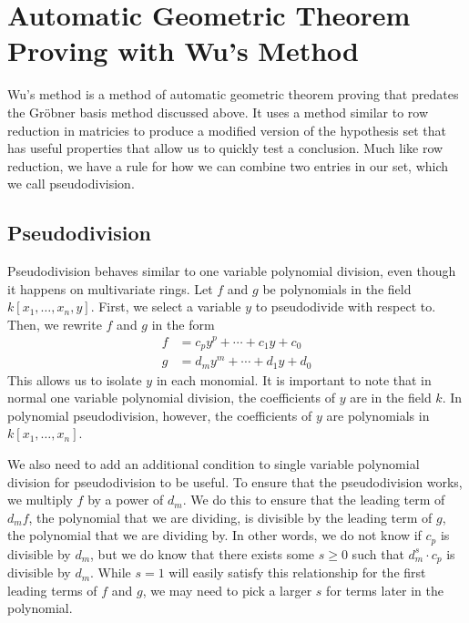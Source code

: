 \documentclass{article}
\theoremstyle{plain}
\theoremstyle{definition}
\theoremstyle{remark}
\newcommand{\gro}{Gr\"obner }
\begin{document}
\section{Automatic Geometric Theorem Proving with Wu's Method}
Wu's method is a method of automatic geometric theorem proving that predates the \gro basis method discussed above. 
It uses a method similar to row reduction in matricies to produce a modified version of the hypothesis set that has useful properties that allow us to quickly test a conclusion.
Much like row reduction, we have a rule for how we can combine two entries in our set, which we call pseudodivision.
\subsection{Pseudodivision}
Pseudodivision behaves similar to one variable polynomial division, even though it happens on multivariate rings. Let $f$ and $g$ be polynomials in the field $k[x_1,\dots,x_n,y]$.
First, we select a variable $y$ to pseudodivide with respect to. Then, we rewrite $f$ and $g$ in the form 
\begin {align*}
    f & = c_py^p + \cdots + c_1y + c_0\\
    g & = d_my^m + \cdots + d_1y + d_0
\end{align*}
This allows us to isolate $y$ in each monomial. It is important to note that in normal one variable polynomial division, the coefficients of $y$ are in the field $k$. 
In polynomial pseudodivision, however, the coefficients of $y$ are polynomials in $k[x_1,\dots,x_n]$.

We also need to add an additional condition to single variable polynomial division for pseudodivision to be useful. 
To ensure that the pseudodivision works, we multiply $f$ by a power of $d_m$. 
We do this to ensure that the leading term of $d_m f$, the polynomial that we are dividing, is divisible by the leading term of $g$, the polynomial that we are dividing by. 
In other words, we do not know if $c_p$ is divisible by $d_m$, but we do know that there exists some $s \geq 0$ such that $d_m^s\cdot c_p$ is divisible by $d_m$.
While $s = 1$ will easily satisfy this relationship for the first leading terms of $f$ and $g$, we may need to pick a larger $s$ for terms later in the polynomial.
\end{document}
